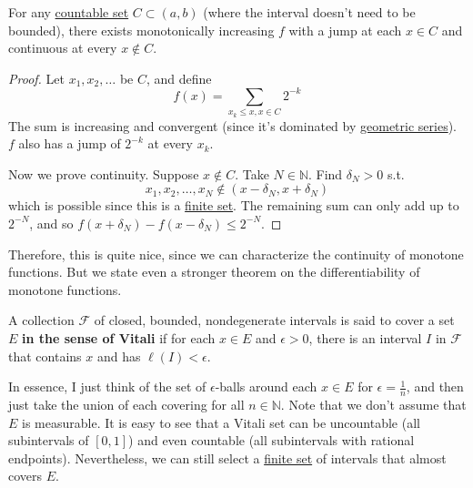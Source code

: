   \begin{theorem}
    \label{thm:construction-of-monotone-functions-with}
    For any \hyperref[st-def:countable]{countable set} $C \subset (a, b)$ (where the interval doesn't need to be bounded), there exists monotonically increasing $f$ with a jump at each $x \in C$ and continuous at every $x \not\in C$. 
  \end{theorem}
  \begin{proof}
    Let $x_1, x_2, \ldots$ be $C$, and define 
    \begin{equation}
      f(x) = \sum_{x_k \leq x, x \in C} 2^{-k}
    \end{equation}
    The sum is increasing and convergent (since it's dominated by \hyperref[real-ex:geometric_series]{geometric series}). $f$ also has a jump of $2^{-k}$ at every $x_k$. 

    Now we prove continuity. Suppose $x \not\in C$. Take $N \in \mathbb{N}$. Find $\delta_N > 0$ s.t. 
    \begin{equation}
      x_1, x_2, \ldots, x_N \not\in (x - \delta_N, x + \delta_N)
    \end{equation}
    which is possible since this is a \hyperref[st-def:finite-set]{finite set}. The remaining sum can only add up to $2^{-N}$, and so $f(x + \delta_N) - f(x - \delta_N) \leq 2^{-N}$. 
  \end{proof}

  Therefore, this is quite nice, since we can characterize the continuity of monotone functions. But we state even a stronger theorem on the differentiability of monotone functions. 

  \begin{definition}
    \label{def:vitali-covering}
    A collection $\mathcal{F}$ of closed, bounded, nondegenerate intervals is said to cover a set $E$ \textbf{in the sense of Vitali} if for each $x \in E$ and $\epsilon > 0$, there is an interval $I$ in $\mathcal{F}$ that contains $x$ and has $\ell(I) < \epsilon$. 
  \end{definition}

  In essence, I just think of the set of $\epsilon$-balls around each $x \in E$ for $\epsilon = \frac{1}{n}$, and then just take the union of each covering for all $n \in \mathbb{N}$. Note that we don't assume that $E$ is measurable. It is easy to see that a Vitali set can be uncountable (all subintervals of $[0, 1]$) and even countable (all subintervals with rational endpoints). Nevertheless, we can still select a \hyperref[st-def:finite-set]{finite set} of intervals that almost covers $E$. 

